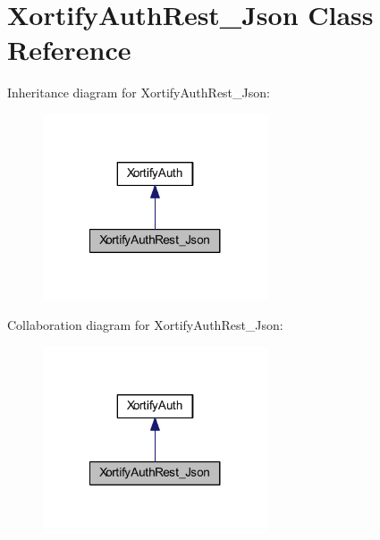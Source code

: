 \hypertarget{class_xortify_auth_rest___json}{\section{Xortify\-Auth\-Rest\-\_\-\-Json Class Reference}
\label{class_xortify_auth_rest___json}
}


Inheritance diagram for Xortify\-Auth\-Rest\-\_\-\-Json\-:
\nopagebreak
\begin{figure}[H]
\begin{center}
\leavevmode
\includegraphics[width=188pt]{class_xortify_auth_rest___json__inherit__graph}
\end{center}
\end{figure}


Collaboration diagram for Xortify\-Auth\-Rest\-\_\-\-Json\-:
\nopagebreak
\begin{figure}[H]
\begin{center}
\leavevmode
\includegraphics[width=188pt]{class_xortify_auth_rest___json__coll__graph}
\end{center}
\end{figure}
